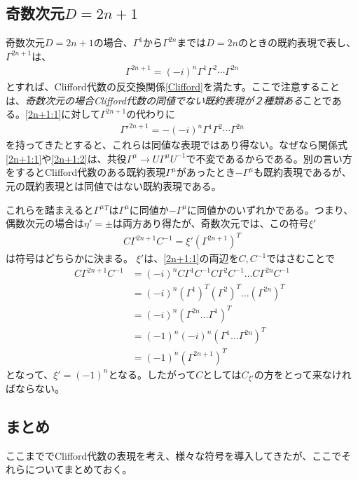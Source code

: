 \documentclass[12pt,a4paper]{jlreq}
\begin{document}
\subsection{奇数次元$D=2n+1$}
奇数次元$D=2n+1$の場合、$\Gamma^1$から$\Gamma^{2n}$までは$D=2n$のときの既約表現で表し、$\Gamma^{2n+1}$は、
\begin{align}
  \Gamma^{2n+1}=(-i)^n \Gamma^{1}\Gamma^{2}\cdots \Gamma^{2n}
  \label{2n+1:1}
\end{align}
とすれば、Clifford代数の反交換関係\eqref{Clifford}を満たす。ここで注意することは、\emph{奇数次元の場合Clifford代数の同値でない既約表現が２種類ある}ことである。\eqref{2n+1:1}に対して$\Gamma^{2n+1}$の代わりに
\begin{align}
  \Gamma'^{2n+1}=-(-i)^n \Gamma^{1}\Gamma^{2}\cdots \Gamma^{2n}\label{2n+1:2}
\end{align}
を持ってきたとすると、これらは同値な表現ではあり得ない。なぜなら関係式\eqref{2n+1:1}や\eqref{2n+1:2}は、共役$\Gamma^{\mu}\to U\Gamma^{\mu}U^{-1}$で不変であるからである。別の言い方をするとClifford代数のある既約表現$\Gamma^{\mu}$があったとき$-\Gamma^{\mu}$も既約表現であるが、元の既約表現とは同値ではない既約表現である。

これらを踏まえると$\Gamma^{\mu}{}^{T}$は$\Gamma^{\mu}$に同値か$-\Gamma^{\mu}$に同値かのいずれかである。つまり、偶数次元の場合は$\eta'=\pm$は両方あり得たが、奇数次元では、この符号$\xi'$
\begin{align*}
  C\Gamma^{2n+1}C^{-1}=\xi' (\Gamma^{2n+1})^{T}
\end{align*}
は符号はどちらかに決まる。
$\xi'$は、\eqref{2n+1:1}の両辺を$C,C^{-1}$ではさむことで
\begin{align*}
  C\Gamma^{2n+1}C^{-1}&=(-i)^n
  C\Gamma^{1}C^{-1}C\Gamma^2C^{-1}\dots C\Gamma^{2n}C^{-1}\\
  &=(-i)^n(\Gamma^{1})^T(\Gamma^{2})^T\dots (\Gamma^{2n})^T\\
  &=(-i)^n(\Gamma^{2n}\dots \Gamma^{1})^T\\
  &=(-1)^n (-i)^n(\Gamma^1\dots \Gamma^{2n})^T\\
  &=(-1)^n (\Gamma^{2n+1})^T
\end{align*}
となって、$\xi'=(-1)^n$となる。したがって$C$としては$C_{\xi'}$の方をとって来なければならない。
\subsection{まとめ}
ここまででClifford代数の表現を考え、様々な符号を導入してきたが、ここでそれらについてまとめておく。
\end{document}

